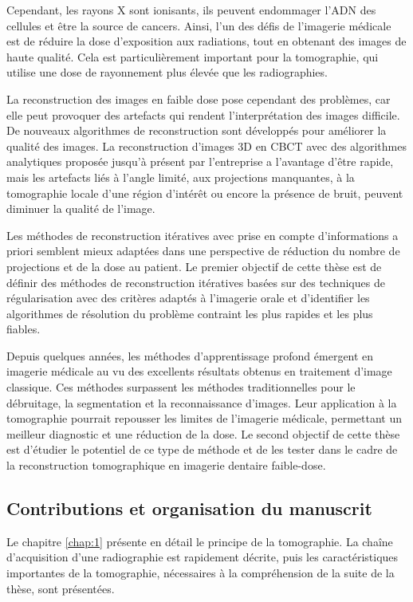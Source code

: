 Cependant, les rayons X sont ionisants, ils peuvent endommager l'ADN des cellules et être la source de cancers. Ainsi, l'un des défis de l'imagerie médicale est de réduire la dose d'exposition aux radiations, tout en obtenant des images de haute qualité. Cela est particulièrement important pour la tomographie, qui utilise une dose de rayonnement plus élevée que les radiographies.

La reconstruction des images en faible dose pose cependant des problèmes, car elle peut provoquer des artefacts qui rendent l'interprétation des images difficile. De nouveaux algorithmes de reconstruction sont développés pour améliorer la qualité des images. La reconstruction d'images 3D en CBCT avec des algorithmes analytiques proposée jusqu'à présent par l'entreprise a l'avantage d'être rapide, mais les artefacts liés à l'angle limité, aux projections manquantes, à la tomographie locale d'une région d'intérêt ou encore la présence de bruit, peuvent diminuer la qualité de l'image. 

Les méthodes de reconstruction itératives avec prise en compte d'informations a priori semblent mieux adaptées dans une perspective de réduction du nombre de projections et de la dose au patient. Le premier objectif de cette thèse est de définir des méthodes de reconstruction itératives basées sur des techniques de régularisation avec des critères adaptés à l'imagerie orale et d'identifier les algorithmes de résolution du problème contraint les plus rapides et les plus fiables. 

Depuis quelques années, les méthodes d'apprentissage profond émergent en imagerie médicale au vu des excellents résultats obtenus en traitement d'image classique. Ces méthodes surpassent les méthodes traditionnelles pour le débruitage, la segmentation et la reconnaissance d'images. Leur application à la tomographie pourrait repousser les limites de l'imagerie médicale, permettant un meilleur diagnostic et une réduction de la dose. Le second objectif de cette thèse est d'étudier le potentiel de ce type de méthode et de les tester dans le cadre de la reconstruction tomographique en imagerie dentaire faible-dose. 

\subsection*{Contributions et organisation du manuscrit}

Le chapitre \ref{chap:1} présente en détail le principe de la tomographie. La chaîne d'acquisition d'une radiographie est rapidement décrite, puis les caractéristiques importantes de la tomographie, nécessaires à la compréhension de la suite de la thèse, sont présentées. 




















